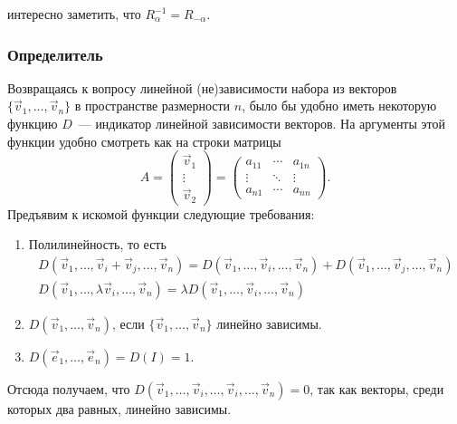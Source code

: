     интересно заметить, что $R_\alpha^{-1} = R_{-\alpha}$.
    
    \subsubsection{Определитель}
    
    Возвращаясь к вопросу линейной (не)зависимости набора из векторов $\{ \vec{v}_1, \ldots, \vec{v}_n \}$ в пространстве размерности $n$, было бы удобно иметь некоторую функцию $D$~--- индикатор линейной зависимости векторов. На аргументы этой функции удобно смотреть как на строки матрицы
    \begin{equation*}
        A = \begin{pmatrix}
            \vec{v}_1 \\ \vdots \\ \vec{v}_2
        \end{pmatrix} = \begin{pmatrix}
            a_{11} & \cdots & a_{1n} \\
            \vdots & \ddots & \vdots \\
            a_{n1} & \cdots & a_{nn}
        \end{pmatrix}.
    \end{equation*}
    Предъявим к искомой функции следующие требования:
    \begin{enumerate}
        \item {
            Полилинейность, то есть 
            \begin{gather*}
                D(\vec{v}_1, \ldots, \vec{v}_i + \vec{v}_j, \ldots, \vec{v}_n) 
                    = D(\vec{v}_1, \ldots, \vec{v}_i, \ldots, \vec{v}_n) 
                        + D(\vec{v}_1, \ldots,\vec{v}_j, \ldots, \vec{v}_n)\\
                D(\vec{v}_1, \ldots, \lambda\vec{v}_i, \ldots, \vec{v}_n) 
                    = \lambda D(\vec{v}_1, \ldots, \vec{v}_i, \ldots, \vec{v}_n)
            \end{gather*}
        }
        \item {
            $D(\vec{v}_1, \ldots, \vec{v}_n)$, если $\{ \vec{v}_1, \ldots, \vec{v}_n \}$ линейно зависимы.
        }
        \item {
            $D(\vec{e}_1, \ldots, \vec{e}_n) = D(I) = 1$.
        }
    \end{enumerate}
    
    Отсюда получаем, что $D(\vec{v}_1, \ldots, \vec{v}_i, \ldots, \vec{v}_i, \ldots, \vec{v}_n) = 0$, так как векторы, среди которых два равных,  линейно зависимы. 
    
